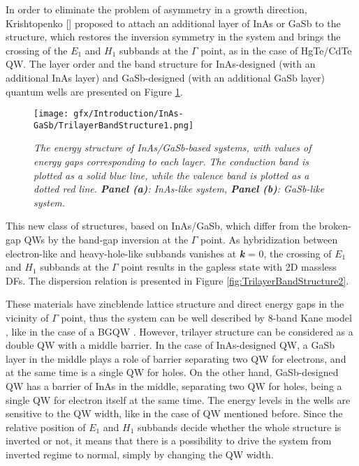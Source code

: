 \documentclass[titlepage,a4paper]{book}
\begin{document}
In order to eliminate the problem of asymmetry in a growth direction, Krishtopenko [] proposed to attach an additional layer of InAs or GaSb to the structure, which restores the inversion symmetry in the system and brings the crossing of the $E_1$ and $H_1$ subbands at the $\Gamma$ point, as in the case of HgTe/CdTe QW. The layer order and the band structure for InAs-designed (with an additional InAs layer) and GaSb-designed (with an additional GaSb layer) quantum wells are presented on Figure \ref{fig:TrilayerBandStructure1}.

\begin{figure}[ht]
	\centering
	\texttt{[image: gfx/Introduction/InAs-GaSb/TrilayerBandStructure1.png]}
	\vspace{-10pt}
	\caption{\textit{The energy structure of InAs/GaSb-based systems, with values of energy gaps corresponding to each layer. The conduction band is plotted as a solid blue line, while the valence band is plotted as a dotted red line. \textbf{Panel (a)}: InAs-like system, \textbf{Panel (b)}: GaSb-like system.}}
	\label{fig:TrilayerBandStructure1}
\end{figure} 

This new class of structures, based on InAs/GaSb, which differ from the broken-gap QWs by the band-gap inversion at the $\Gamma$ point. As hybridization between electron-like and heavy-hole-like subbands vanishes at \textbf{\textit{k}} = 0, the crossing of $E_1$ and $H_1$ subbands at the $\Gamma$ point results in the gapless state with 2D massless DFs. The dispersion relation is presented in Figure \ref{fig:TrilayerBandStructure2}.

These materials have zincblende lattice structure and direct energy gaps in the vicinity of $\Gamma$ point, thus the system can be well described by 8-band Kane model \cite{Kane_Model}, like in the case of a BGQW \cite{Liu_Topology}. However, trilayer structure can be considered as a double QW with a middle barrier. In the case of InAs-designed QW, a GaSb layer in the middle plays a role of barrier separating two QW for electrons, and at the same time is a single QW for holes. On the other hand, GaSb-designed QW has a barrier of InAs in the middle, separating two QW for holes, being a single QW for electron itself at the same time. The energy levels in the wells are sensitive to the QW width, like in the case of QW mentioned before. Since the relative position of $E_1$ and $H_1$ subbands decide whether the whole structure is inverted or not, it means that there is a possibility to drive the system from inverted regime to normal, simply by changing the QW width.  
\end{document}
